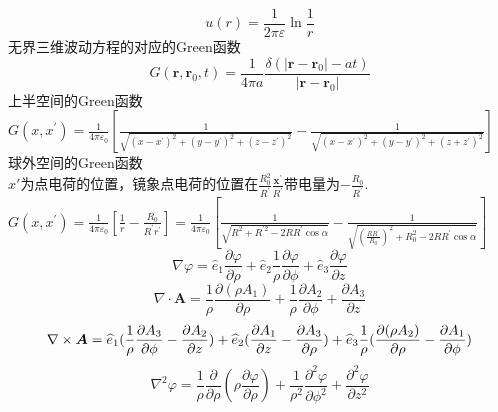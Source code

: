 \documentclass[UTF8,8pt]{ctexart}
\begin{document}
\begin{multicols}{2}
$$    u(r)=\frac{1}{2 \pi \varepsilon} \ln \frac{1}{r}
    $$
    无界三维波动方程的对应的Green函数$$ 
    G\left(\boldsymbol{r}, \boldsymbol{r}_{0}, t\right)=\frac{1}{4 \pi a} \frac{\delta\left(\left|\boldsymbol{r}-\boldsymbol{r}_{0}\right|-a t\right)}{\left|\boldsymbol{r}-\boldsymbol{r}_{0}\right|}
    $$
    上半空间的Green函数
    \\$
    G\left(x, x^{\prime}\right)= \frac{1}{4 \pi \varepsilon_{0}}\left[\frac{1}{\sqrt{\left(x-x^{\prime}\right)^{2}+\left(y-y^{\prime}\right)^{2}+\left(z-z^{\prime}\right)^{2}}}-\frac{1}{\sqrt{\left(x-x^{\prime}\right)^{2}+\left(y-y^{\prime}\right)^{2}+\left(z+z^{\prime}\right)^{2}}} \right] 
    $\\
    球外空间的Green函数\\
    $x'$为点电荷的位置，镜象点电荷的位置在$\frac{R_{0}^{2}}{R^{\prime}} \frac{\boldsymbol{x}^{\prime}}{R^{\prime}}$带电量为$-\frac{R_{0}}{R^{\prime}}$.
    \\$
    G\left(x, x^{\prime}\right)=\frac{1}{4 \pi \varepsilon_{0}}\left[\frac{1}{r}-\frac{R_{0}}{R^{\prime} r^{\prime}}\right]=\frac{1}{4 \pi \varepsilon_{0}}\left[\frac{1}{\sqrt{R^{2}+R^{\prime 2}-2 R R^{\prime} \cos \alpha}} -\frac{1}{\sqrt{\left(\frac{R R^{\prime}}{R_{0}}\right)^{2}+R_{0}^{2}-2 R R^{\prime} \cos \alpha}} \right]
    $\\
    $$\nabla \varphi = \hat e_1 \frac { \partial \varphi } { \partial \rho } + \hat e_2 \frac { 1 } { \rho } \frac { \partial \varphi } { \partial \phi } + \hat { e } _ { 3 } \frac { \partial \varphi } { \partial z }$$
    $$\nabla \cdot \bm{ A } = \frac { 1 } { \rho } \frac { \partial ( \rho A _ { 1 } ) } { \partial \rho } + \frac { 1 } { \rho } \frac { \partial A _ { 2 } } { \partial \phi } + \frac { \partial A _ { 3 } } { \partial z }$$
    $$ { \nabla \times \bm{ A } } =\widehat e_1 (\frac{1}{\rho} \frac { \partial A_3} { \partial \phi } - \frac { \partial A _ { 2 } } { \partial z } ) + \widehat { e } _ { 2 } ( \frac { \partial A _ { 1 } } { \partial z } - \frac { \partial A _ { 3 } } { \partial \rho } ) + \widehat { e } _ { 3 } \frac { 1 } { \rho } ( \frac { \partial ( \rho A _ { 2 } ) } { \partial \rho } - \frac { \partial A _ { 1 } } { \partial \phi } )$$
    $$\nabla ^ { 2 } \varphi = \frac { 1 } { \rho } \frac { \partial } { \partial \rho } ( \rho \frac { \partial \varphi } { \partial \rho } ) + \frac { 1 } { \rho ^ { 2 } } \frac { \partial ^ { 2 } \varphi } { \partial \phi ^ { 2 } } + \frac { \partial ^ { 2 } \varphi } { \partial z ^ { 2 } }$$

\end{multicols}
\end{document}

